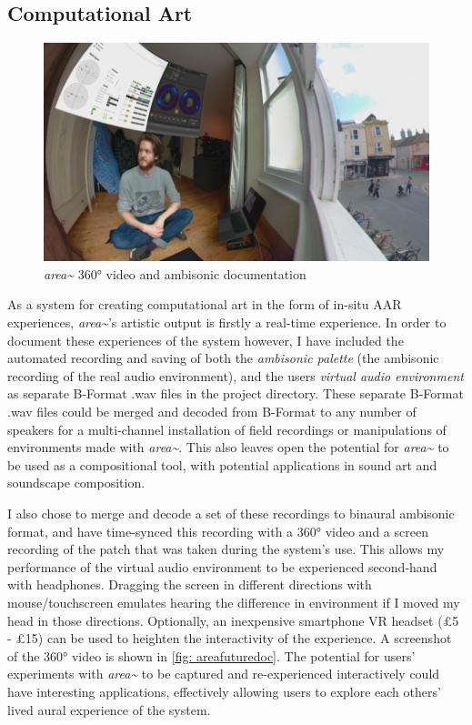 \subsection{Computational Art}                  \label{sec: area-discussion-computationalart}
\begin{figure}
    \centering
    \includegraphics{figures/05-area/areafuturedoc.png}
    \caption{\textit{area\textasciitilde{}} 360° video and ambisonic documentation \citep{bilbow2020}}
    \label{fig: areafuturedoc}
\end{figure}
As a system for creating computational art in the form of in-situ AAR experiences, \textit{area\textasciitilde{}}’s artistic output is firstly a real-time experience. In order to document these experiences of the system however, I have included the automated recording and saving of both the \textit{ambisonic palette} (the ambisonic recording of the real audio environment), and the users \textit{virtual audio environment} as separate B-Format .wav files in the project directory. These separate B-Format .wav files could be merged and decoded from B-Format to any number of speakers for a multi-channel installation of field recordings or manipulations of environments made with \textit{area\textasciitilde{}}. This also leaves open the potential for \textit{area\textasciitilde{}} to be used as a compositional tool, with potential applications in sound art and soundscape composition.

I also chose to merge and decode a set of these recordings to binaural ambisonic format, and have time-synced this recording with a 360° video and a screen recording of the patch that was taken during the system’s use. This allows my performance of the virtual audio environment to be experienced second-hand with headphones. Dragging the screen in different directions with mouse/touchscreen emulates hearing the difference in environment if I moved my head in those directions. Optionally, an inexpensive smartphone VR headset (£5 - £15) can be used to heighten the interactivity of the experience. A screenshot of the 360° video \citep{bilbow2020} is shown in \autoref{fig: areafuturedoc}. The potential for users’ experiments with \textit{area\textasciitilde{}} to be captured and re-experienced interactively could have interesting applications, effectively allowing users to explore each others’ lived aural experience of the system.

